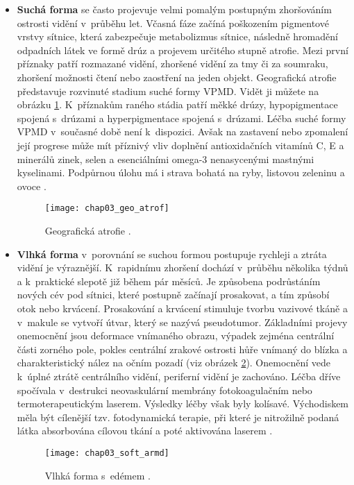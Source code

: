 \begin{itemize}
  \item\textbf{Suchá forma} se často projevuje velmi pomalým postupným zhoršováním ostrosti vidění v~průběhu let. Včasná fáze začíná poškozením pigmentové vrstvy sítnice, která zabezpečuje metabolizmus sítnice, následně hromadění odpadních látek ve formě drúz a projevem určitého stupně atrofie. Mezi první příznaky patří rozmazané vidění, zhoršené vidění za tmy či za soumraku, zhoršení možnosti čtení nebo zaostření na jeden objekt. Geografická atrofie představuje rozvinuté stadium suché formy VPMD. Vidět ji můžete na obrázku \ref{pic:chap03_geo_atrof}. K~příznakům raného stádia patří měkké drúzy, hypopigmentace spojená s~drúzami a hyperpigmentace spojená s~drúzami. Léčba suché formy VPMD v~současné době není k~dispozici. Avšak na zastavení nebo zpomalení její progrese může mít příznivý vliv doplnění antioxidačních vitamínů C, E a minerálů zinek, selen a esenciálními omega-3 nenasycenými mastnými kyselinami. Podpůrnou úlohu má i strava bohatá na ryby, listovou zeleninu a ovoce \cite{vpmd_kolar}.
  
  \begin{figure}[h]
    \begin{center}
      \texttt{[image: chap03\_geo\_atrof]}
      \caption{Geografická atrofie \cite{pic_geo_atrof}.}
      \label{pic:chap03_geo_atrof}
    \end{center}
  \end{figure}

  \item\textbf{Vlhká forma} v~porovnání se suchou formou postupuje rychleji a ztráta vidění je výraznější. K~rapidnímu zhoršení dochází v~průběhu několika týdnů a k~praktické slepotě již během pár měsíců. Je způsobena podrůstáním nových cév pod sítnici, které postupně začínají prosakovat, a tím způsobí otok nebo krvácení. Prosakování a krvácení stimuluje tvorbu vazivové tkáně a v~makule se vytvoří útvar, který se nazývá pseudotumor. Základními projevy onemocnění jsou deformace vnímaného obrazu, výpadek zejména centrální části zorného pole, pokles centrální zrakové ostrosti hůře vnímaný do blízka a charakteristický nález na očním pozadí (viz obrázek \ref{pic:chap03_soft_armd}). Onemocnění vede k~úplné ztrátě centrálního vidění, periferní vidění je zachováno. Léčba dříve spočívala v~destrukci neovaskulární membrány fotokoagulačním nebo termoterapeutickým laserem. Výsledky léčby však byly kolísavé. Východiskem měla být cílenější tzv. fotodynamická terapie, při které je nitrožilně podaná látka absorbována cílovou tkání a poté aktivována laserem \cite{vpmd_kolar}.
  
  \begin{figure}[h]
    \begin{center}
      \texttt{[image: chap03\_soft\_armd]}
      \caption{Vlhká forma s~edémem \cite{pic_soft_armd}.}
      \label{pic:chap03_soft_armd}
    \end{center}
  \end{figure}

\end{itemize}


